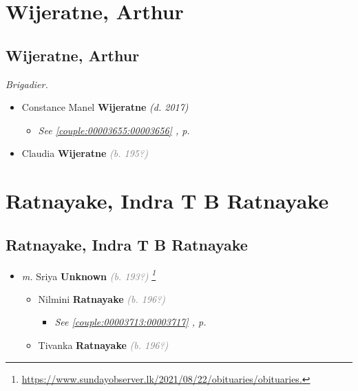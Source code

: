 \documentclass[10pt, openany]{book}
\begin{document}
\part{Wijeratne, Arthur}
\chapter{Wijeratne, Arthur}
\label{00003657}
\textcolor{slmaroon}{\textit{Brigadier.}}
\begin{itemize}
\item{Constance Manel \textbf{Wijeratne} \textcolor{slorange}{\textit{(d. 2017)}}
\begin{itemize}
\item{\textcolor{slteal}{\textit{See  \autoref{couple:00003655:00003656} \textit{, p. \pageref{couple:00003655:00003656} }}}}
\end{itemize}
  }
\item{Claudia \textbf{Wijeratne} \textcolor{gray}{\textit{(b. 195?)}}
 }
\end{itemize}
 
\part{Ratnayake, Indra T B Ratnayake}
\chapter{Ratnayake, Indra T B Ratnayake}
\label{00003723}
\textcolor{slmaroon}{\textit{}}
\begin{itemize}
\item{\textit{m.} Sriya \textbf{Unknown} \textcolor{gray}{\textit{(b. 193?)}} \textcolor{slmaroon}{\textit{\footnote{\url{https://www.sundayobserver.lk/2021/08/22/obituaries/obituaries.}}}}   \label{couple:00003723:00003724} \begin{itemize}
\item{Nilmini \textbf{Ratnayake} \textcolor{gray}{\textit{(b. 196?)}}
\begin{itemize}
\item{\textcolor{slteal}{\textit{See  \autoref{couple:00003713:00003717} \textit{, p. \pageref{couple:00003713:00003717} }}}}
\end{itemize}
 }
\item{Tivanka \textbf{Ratnayake} \textcolor{gray}{\textit{(b. 196?)}}
 }
\end{itemize}}
\end{itemize}
    
\end{document}
